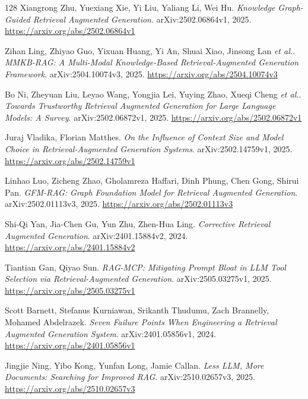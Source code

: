 \documentclass[11pt,a4paper]{article}
\begin{document}
\begin{thebibliography}{128}
Xiangrong Zhu, Yuexiang Xie, Yi Liu, Yaliang Li, Wei Hu.
\newblock \emph{Knowledge Graph-Guided Retrieval Augmented Generation}.
\newblock arXiv:2502.06864v1, 2025.
\newblock \url{https://arxiv.org/abs/2502.06864v1}

Zihan Ling, Zhiyao Guo, Yixuan Huang, Yi An, Shuai Xiao, Jinsong Lan \emph{et al.}.
\newblock \emph{MMKB-RAG: A Multi-Modal Knowledge-Based Retrieval-Augmented Generation Framework}.
\newblock arXiv:2504.10074v3, 2025.
\newblock \url{https://arxiv.org/abs/2504.10074v3}

Bo Ni, Zheyuan Liu, Leyao Wang, Yongjia Lei, Yuying Zhao, Xueqi Cheng \emph{et al.}.
\newblock \emph{Towards Trustworthy Retrieval Augmented Generation for Large Language Models: A Survey}.
\newblock arXiv:2502.06872v1, 2025.
\newblock \url{https://arxiv.org/abs/2502.06872v1}

Juraj Vladika, Florian Matthes.
\newblock \emph{On the Influence of Context Size and Model Choice in Retrieval-Augmented Generation Systems}.
\newblock arXiv:2502.14759v1, 2025.
\newblock \url{https://arxiv.org/abs/2502.14759v1}

Linhao Luo, Zicheng Zhao, Gholamreza Haffari, Dinh Phung, Chen Gong, Shirui Pan.
\newblock \emph{GFM-RAG: Graph Foundation Model for Retrieval Augmented Generation}.
\newblock arXiv:2502.01113v3, 2025.
\newblock \url{https://arxiv.org/abs/2502.01113v3}

Shi-Qi Yan, Jia-Chen Gu, Yun Zhu, Zhen-Hua Ling.
\newblock \emph{Corrective Retrieval Augmented Generation}.
\newblock arXiv:2401.15884v2, 2024.
\newblock \url{https://arxiv.org/abs/2401.15884v2}

Tiantian Gan, Qiyao Sun.
\newblock \emph{RAG-MCP: Mitigating Prompt Bloat in LLM Tool Selection via Retrieval-Augmented Generation}.
\newblock arXiv:2505.03275v1, 2025.
\newblock \url{https://arxiv.org/abs/2505.03275v1}

Scott Barnett, Stefanus Kurniawan, Srikanth Thudumu, Zach Brannelly, Mohamed Abdelrazek.
\newblock \emph{Seven Failure Points When Engineering a Retrieval Augmented Generation System}.
\newblock arXiv:2401.05856v1, 2024.
\newblock \url{https://arxiv.org/abs/2401.05856v1}

Jingjie Ning, Yibo Kong, Yunfan Long, Jamie Callan.
\newblock \emph{Less LLM, More Documents: Searching for Improved RAG}.
\newblock arXiv:2510.02657v3, 2025.
\newblock \url{https://arxiv.org/abs/2510.02657v3}


\end{thebibliography}
\end{document}
